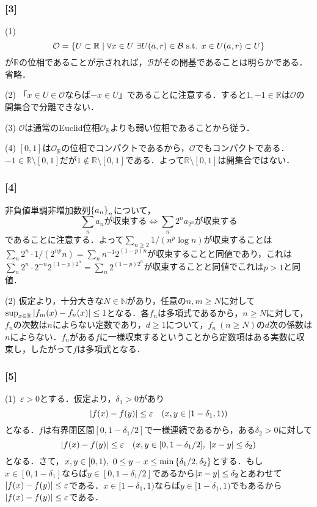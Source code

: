 \documentclass[a4j]{ltjsarticle}
\newcommand{\Rset}{\mathbb{R}}
\newcommand{\Nset}{\mathbb{N}}
\newcommand{\1}{\mathbbm{1}}
\numberwithin{equation}{section}
\theoremstyle{definition}
\begin{document}
\subsubsection*{[3]}
(1) 
\begin{equation}
    \mathcal{O}=\qty{U\subset \Rset\mid \forall x\in U\ \exists U(a,r)\in \mathcal{B}\ \text{s.t. }x\in U(a,r)\subset U}
\end{equation} 
が$\Rset$の位相であることが示されれば，$\mathcal{B}$がその開基であることは明らかである．省略．

(2) 「$x\in U\in \mathcal{O}$ならば$-x\in U$」であることに注意する．すると$1,-1\in\Rset$は$\mathcal{O}$の開集合で分離できない．

(3) $\mathcal{O}$は通常のEuclid位相$\mathcal{O}_{\Rset}$よりも弱い位相であることから従う．

(4) $[0,1]$は$\mathcal{O}_{\Rset}$の位相でコンパクトであるから，$\mathcal{O}$でもコンパクトである．$-1\in \Rset\setminus[0,1]$だが$1\notin \Rset\setminus[0,1]$である．よって$\Rset\setminus[0,1]$は開集合ではない．
\subsubsection*{[4]}
非負値単調非増加数列$\qty{a_n}_{n}$について，
\begin{equation}
    \text{$\sum_{n}a_n$が収束する}\iff \text{$\sum_{n}2^n a_{2^n}$が収束する}
\end{equation}
であることに注意する．よって$\sum_{n\geq2}1/(n^p\log n)$が収束することは$\sum_{n}2^n\cdot 1/(2^{np}n)=\sum_{n}n^{-1}2^{(1-p)n}$が収束することと同値であり，これは$\sum_{n}2^n\cdot 2^{-n}2^{(1-p)2^{n}}=\sum_{n}2^{(1-p)2^n}$が収束することと同値でこれは$p>1$と同値．

(2) 仮定より，十分大きな$N\in\Nset$があり，任意の$n,m\geq N$に対して$\sup_{x\in\Rset}\abs{f_m(x)-f_n(x)}\leq 1$となる．各$f_n$は多項式であるから，$n\geq N$に対して，$f_n$の次数は$n$によらない定数であり，$d\geq1$について，$f_n\ (n\geq N)$の$d$次の係数は$n$によらない．$f_n$がある$f$に一様収束するということから定数項はある実数に収束し，したがって$f$は多項式となる．

\subsubsection*{[5]}
(1)\ $\varepsilon>0$とする．仮定より，$\delta_1>0$があり
\begin{equation}
    \abs{f(x)-f(y)}\leq \varepsilon\quad (x,y\in [1-\delta_1,1))
\end{equation}
となる．$f$は有界閉区間$[0,1-\delta_1/2]$で一様連続であるから，ある$\delta_2>0$に対して
\begin{equation}
    \abs{f(x)-f(y)}\leq \varepsilon\quad (x,y\in [0,1-\delta_1/2],\ \abs{x-y}\leq \delta_2)
\end{equation}
となる．さて，$x,y\in[0,1),\ 0\leq y-x\leq \min\qty{\delta_1/2,\delta_2}$とする．もし$x\in [0,1-\delta_1]$ならば$y\in[0,1-\delta_1/2]$であるから$\abs{x-y}\leq \delta_2$とあわせて$\abs{f(x)-f(y)}\leq\varepsilon$である．$x\in [1-\delta_1,1)$ならば$y\in[1-\delta_1,1)$でもあるから$\abs{f(x)-f(y)}\leq\varepsilon$である．
\end{document}
